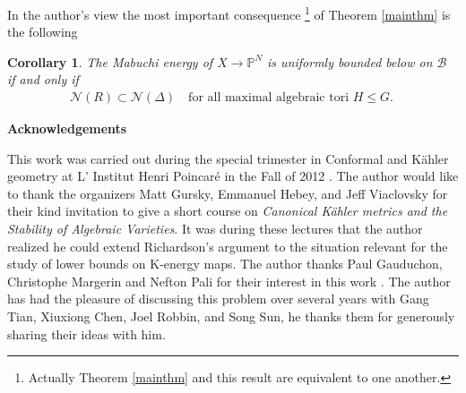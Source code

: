 \documentclass[12pt]{amsart}
\newtheorem{corollary}{Corollary}
\numberwithin{equation}{section}
\numberwithin{remark}{section}
\numberwithin{theorem}{section}
\numberwithin{proposition}{section}
\numberwithin{definition}{section}
\numberwithin{lemma}{section}
\numberwithin{claim}{section}
\numberwithin{corollary}{section}
\numberwithin{conjecture}{section}
\begin{document}
 In the author's view the most important consequence \footnote{ Actually Theorem \ref{mainthm} and this result are equivalent to one another.} of Theorem \ref{mainthm} is the following
 \begin{corollary}\label{polytopes} The Mabuchi energy of $X{\ensuremath{\longrightarrow}} {\ensuremath{\mathbb{P}^{N}}}$ is uniformly bounded below on $\mathcal{B}$ if and only if
 \begin{align}
 \mathcal{N}(R)\subset \mathcal{N}(\Delta) \quad \mbox{for all maximal algebraic tori $H\leq G$.} \ 
 \end{align}
 \end{corollary}
 \begin{center}\textbf{Acknowledgements}\end{center}
 This work was carried out  during the special trimester in Conformal and K\" ahler geometry at L' Institut Henri Poincar\'e in the Fall of 2012   . The author would like to thank the organizers Matt Gursky, Emmanuel Hebey, and Jeff Viaclovsky for their kind invitation to give a short course on \emph{Canonical K\"ahler metrics and the Stability of Algebraic Varieties}.  It was during these lectures that the author realized he could extend Richardson's argument to the situation relevant for the study of lower bounds on K-energy maps. The author thanks Paul Gauduchon, Christophe Margerin and Nefton Pali for their interest in this work . The author has had the pleasure of discussing this problem over several years with Gang Tian, Xiuxiong Chen, Joel Robbin, and Song Sun, he thanks them for generously sharing their ideas with him. 
 
  
\end{document}
